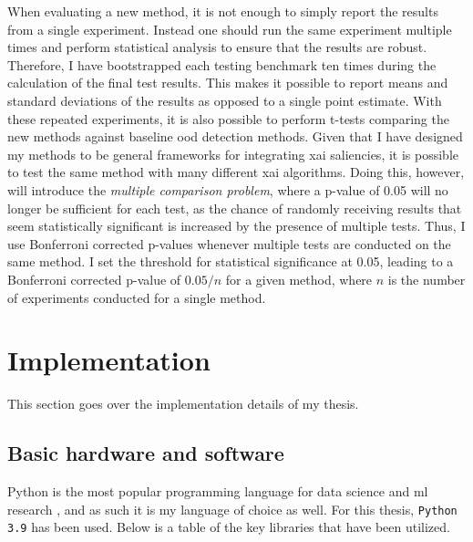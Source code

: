 \documentclass[UKenglish]{uiomasterthesis} %
\theoremstyle{definition}
\begin{document}
When evaluating a new method, it is not enough to simply report the results from a single experiment. Instead one should run the same experiment multiple times and perform statistical analysis to ensure that the results are robust. Therefore, I have bootstrapped each testing benchmark ten times during the calculation of the final test results. This makes it possible to report means and standard deviations of the results as opposed to a single point estimate. With these repeated experiments, it is also possible to perform t-tests comparing the new methods against baseline \ac{ood} detection methods. Given that I have designed my methods to be general frameworks for integrating \ac{xai} saliencies, it is possible to test the same method with many different \ac{xai} algorithms. Doing this, however, will introduce the {\it multiple comparison problem}, where a p-value of 0.05 will no longer be sufficient for each test, as the chance of randomly receiving results that seem statistically significant is increased by the presence of multiple tests. Thus, I use Bonferroni corrected p-values whenever multiple tests are conducted on the same method. I set the threshold for statistical significance at 0.05, leading to a Bonferroni corrected p-value of $0.05 / n$ for a given method, where $n$ is the number of experiments conducted for a single method.

\section{Implementation}

This section goes over the implementation details of my thesis.

\subsection{Basic hardware and software}

Python is the most popular programming language for data science and \ac{ml} research \cite{nguyen2019machine}, and as such it is my language of choice as well. For this thesis, \texttt{Python 3.9} has been used. Below is a table of the key libraries that have been utilized.
\end{document}
